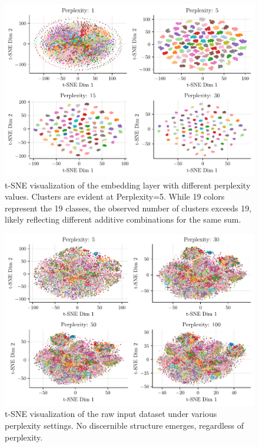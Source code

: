 \documentclass{article}
\begin{document}
\begin{figure}[!htbp]
    \centering
    \includegraphics[width=0.9\linewidth]{./images/embeddings_tsne.pdf}
    \caption{t-SNE visualization of the embedding layer with different perplexity values. Clusters are evident at Perplexity=5. While 19 colors represent the 19 classes, the observed number of clusters exceeds 19, likely reflecting different additive combinations for the same sum.}
\label{fig:embedding-tsne}
\end{figure}

\begin{figure}[!htbp]
    \centering
    \includegraphics[width=0.9\linewidth]{./images/inputs_tsne.pdf}
    \caption{t-SNE visualization of the raw input dataset under various perplexity settings. No discernible structure emerges, regardless of perplexity.}
\label{fig:input-tsne}
\end{figure}
\end{document}

